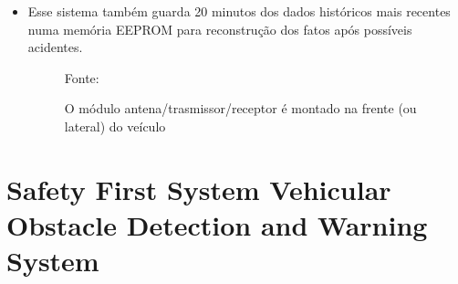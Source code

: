 \documentclass[xcolor=dvipsnames, aspectratio=169]{beamer}
\begin{document}
\begin{frame}
\begin{itemize}
		\item Esse sistema também guarda 20 minutos dos dados históricos mais recentes numa memória EEPROM para reconstrução dos fatos após possíveis acidentes.
        \begin{figure}
            \centering
            {Fonte: \cite{everett1995sensors}}
            \caption{O módulo antena/trasmissor/receptor é montado na frente (ou lateral) do veículo}
            \label{fig:curva_de_freq}
        \end{figure} 
	\end{itemize}
\end{frame}


\section[Safety First System Vehicular Obstacle Detection and Warning System]{Safety First System Vehicular Obstacle Detection and Warning System} 
\end{document}
